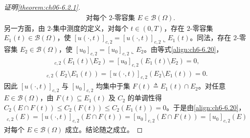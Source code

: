 \documentclass[../../main.tex]{subfiles}%
\begin{document}
\begin{proof}[证明\cref{theorem:ch06-6.2.1}]
\begin{align}
\quad\text{对每个 }2\text{-零容集 }E\in\mathscr{B}(\Omega). \label{align:ch6-6.20}
\end{align}
另一方面，由 $2$-集中测度的定义，对每个 $t\in(0,T)$，存在 $2$-零容集 $E_1(t)\in\mathscr{B}(\Omega)$，使 $[u(\cdot,t)]_{c,2}=[u(\cdot,t)]_{c,2}\llcorner E_1(t)$。同法，存在 $2$-零容集 $E_2\in\mathscr{B}(\Omega)$，使 $[u_0]_{c,2}=[u_0]_{c,2}\llcorner E_2$。由等式\eqref{align:ch6-6.20}，
\begin{align*}
[u(\cdot,t)]_{c,2}(E_1(t)\setminus E_2)=[u_0]_{c,2}(E_1(t)\setminus E_2)=0,
\end{align*}
\begin{align*}
[u_0]_{c,2}(E_2\setminus E_1(t))=[u(\cdot,t)]_{c,2}(E_2\setminus E_1(t))=0.
\end{align*}
因此 $[u(\cdot,t)]_{c,2}$ 与 $[u_0]_{c,2}$ 均集中于集 $F(t)\triangleq E_1(t)\cap E_2$。对任意 $E\in\mathscr{B}(\Omega)$，由 $F(t)\subseteq E_1(t)$ 及 $C_2$ 的单调性得 $C_2(E\cap F(t))\leqslant C_2(F(t))\leqslant C_2(E_1(t))=0$。于是由\eqref{align:ch6-6.20}，
\begin{align*}
[u(\cdot,t)]_{c,2}(E)=[u(\cdot,t)]_{c,2}(E\cap F(t))
=[u_0]_{c,2}(E\cap F(t))=[u_0]_{c,2}(E)
\end{align*}
对每个 $E\in\mathscr{B}(\Omega)$ 成立。结论随之成立。
\end{proof}
\end{document}
